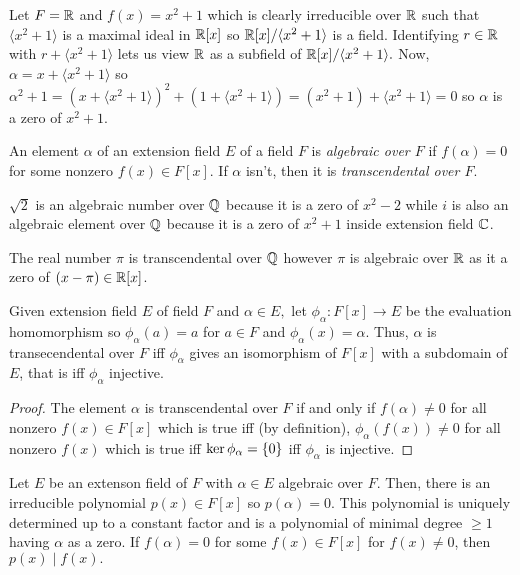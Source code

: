 \begin{example}
    Let $F = \mathbb{R}$ and $f(x) = x^2+1$ which is clearly irreducible over $\mathbb{R}$ such that $\langle x^2 + 1 \rangle$ is a maximal ideal in $\mathbb{R}[x]$ so $\mathbb{R}[x]/\langle x^2 + 1 \rangle$ is a field. Identifying $r \in \mathbb{R}$ with $r + \langle x^2 + 1 \rangle$ lets us view $\mathbb{R}$ as a subfield of $\mathbb{R}[x] / \langle x^2 + 1 \rangle.$ Now, $\alpha = x + \langle x^2 + 1 \rangle$ so $\alpha^2 + 1 = (x + \langle x^2 + 1 \rangle)^2 + (1+\langle x^2 + 1 \rangle) = (x^2+1) + \langle x^2 + 1 \rangle = 0$ so $\alpha$ is a zero of $x^2 + 1.$
\end{example}
\begin{definition}
    An element $\alpha$ of an extension field $E$ of a field $F$ is \emph{algebraic over $F$} if $f(\alpha) = 0$ for some nonzero $f(x) \in F[x]$. If $\alpha$ isn't, then it is \emph{transcendental over $F$}.
\end{definition}
\begin{example}
    $\sqrt{2}$ is an algebraic number over $\mathbb{Q}$ because it is a zero of $x^2-2$ while $i$ is also an algebraic element over $\mathbb{Q}$ because it is a zero of $x^2 + 1$ inside extension field $\mathbb{C}$.
\end{example}
\begin{example}
    The real number $\pi$ is transcendental over $\mathbb{Q}$ however $\pi$ is algebraic over $\mathbb{R}$ as it a zero of $(x-\pi) \in \mathbb{R}[x]$.
\end{example}
\begin{theorem}
    Given extension field $E$ of field $F$ and $\alpha \in E,$ let $\phi_\alpha\colon F[x] \to E$ be the evaluation homomorphism so $\phi_\alpha(a) = a$ for $a \in F$ and $\phi_\alpha(x) = \alpha.$ Thus, $\alpha$ is transecendental over $F$ iff $\phi_\alpha$ gives an isomorphism of $F[x]$ with a subdomain of $E$, that is iff $\phi_\alpha$ injective.
\end{theorem}
\begin{proof}
    The element $\alpha$ is transcendental over $F$ if and only if $f(\alpha) \neq 0$ for all nonzero $f(x) \in F[x]$ which is true iff (by definition), $\phi_\alpha(f(x)) \neq 0$ for all nonzero $f(x)$ which is true iff $\operatorname{ker}\phi_\alpha = \{0\}$ iff $\phi_\alpha$ is injective.
\end{proof}
\begin{theorem}
    Let $E$ be an extenson field of $F$ with $\alpha \in E$ algebraic over $F$. Then, there is an irreducible polynomial $p(x) \in F[x]$ so $p(\alpha) = 0$. This polynomial is uniquely determined up to a constant factor and is a polynomial of minimal degree $\geq 1$ having $\alpha$ as a zero. If $f(\alpha) = 0$ for some $f(x) \in F[x]$ for $f(x) \neq 0$, then $p(x) \mid f(x).$
\end{theorem}

